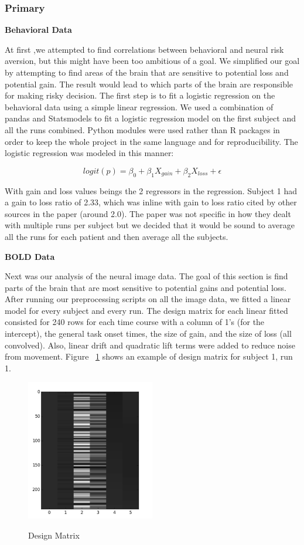 \documentclass[11pt]{article}
\begin{document}
\subsubsection{Primary}

\textbf{Behavioral Data}

At first ,we attempted to find correlations between behavioral and neural risk
aversion, but this might have been too ambitious of a goal. We simplified our
goal by attempting to find areas of the brain that are sensitive to potential
loss and potential gain. The result would lead to which parts of the brain are
responsible for making risky decision. The first step is to fit a logistic
regression on the behavioral data using a simple linear regression. We used a
combination of pandas and Statsmodels to fit a logistic regression model on the
first subject and all the runs combined. Python modules were used rather than R
packages in order to keep the whole project in the same language and for
reproducibility. The logistic regression was modeled in this manner:

\[ logit(p) = \beta_0 + \beta_1 X_{gain} + \beta_2 X_{loss} + \epsilon \] 

With gain and loss values beings the 2 regressors in the regression. Subject 1
had a gain to loss ratio of 2.33, which was inline with gain to loss ratio
cited by other sources in the paper (around 2.0). The paper was not specific in
how they dealt with multiple runs per subject but we decided that it would be
sound to average all the runs for each patient and then average all the
subjects.

\textbf{BOLD Data}

Next was our analysis of the neural image data. The goal of this section is
find parts of the brain that are most sensitive to potential gains and
potential loss. After running our preprocessing scripts on all the image data,
we fitted a linear model for every subject and every run. The design matrix for
each linear fitted consisted for 240 rows for each time course with a column of
1’s (for the intercept), the general task onset times, the size of gain, and
the size of loss (all convolved). Also, linear drift and quadratic lift terms
were added to reduce noise from movement. Figure ~\ref{fig:design-matrix}
shows an example of design matrix for subject 1, run 1.

\begin{figure}[h]
\caption{Design Matrix}
\centering
\includegraphics[width=0.5\textwidth]{design-matrix.png}
\label{fig:design-matrix}
\end{figure}
\end{document}
